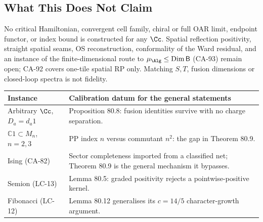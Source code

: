 \subsection{What This Does Not Claim}

No critical Hamiltonian, convergent cell family, chiral or full OAR limit, endpoint functor, or index bound
is constructed for any \(\Cc\).  Spatial reflection positivity, straight spatial seams, OS reconstruction,
conformality of the Ward residual, and an instance of the finite-dimensional route to \(\mu_\Alg\le\operatorname{Dim}\mathsf B\)
(CA-93) remain open; CA-92 covers one-tile spatial RP only.  Matching \(S,T\), fusion dimensions or closed-loop spectra is not fidelity.

\begin{center}\footnotesize
\begin{tabular}{p{3.6cm}p{10.4cm}}
\toprule
Instance & Calibration datum for the general statements \\
\midrule
Arbitrary \(\Cc\), \(D_a=d_a1\) & Proposition 80.8: fusion identities survive with no charge separation. \\
\(\mathbb C1\subset M_n\), \(n=2,3\) & PP index \(n\) versus commutant \(n^2\): the gap in Theorem 80.9. \\
Ising (CA-82) & Sector completeness imported from a classified net; Theorem 80.9 is the general mechanism it bypasses. \\
Semion (LC-13) & Lemma 80.5: graded positivity rejects a pointwise-positive kernel. \\
Fibonacci (LC-12) & Lemma 80.12 generalises its \(c=14/5\) character-growth argument. \\
\bottomrule
\end{tabular}
\end{center}
